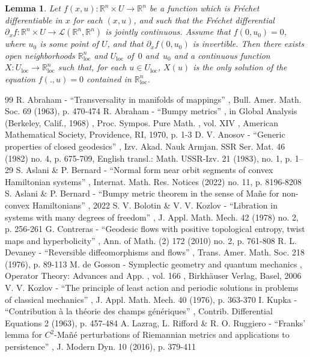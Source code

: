\documentclass[10pt]{amsart}
\newcommand{\loc}{\mathrm{loc}}
\newcommand{\Rm}{\mathbb{R}}
\newcommand{\mL}{\ensuremath{\mathcal{L}}}
\theoremstyle{plain}
\newtheorem{lem}{Lemma}
\theoremstyle{definition}
\begin{document}
\begin{lem}
Let $f(x,u):\Rm^n\times U\to \Rm^n$ be a function which is Fréchet differentiable in $x$ for each $(x,u)$, and such that
the Fréchet differential $\partial_xf:\Rm^n\times U\to \mL(\Rm^n,\Rm^n)$ is jointly continuous. Assume that $f(0,u_0)=0$, where $u_0$ is some point of $U$, and that $\partial_x f(0,u_0)$ is invertible. Then there exists open neighborhoods $\Rm^n_{\loc}$ and $U_{\loc}$ of~$0$ and~$u_0$ and a continuous function $X: U_{\loc}\to \Rm^n_{\loc}$ such that, for each $u\in U_{\loc}$,
$X(u)$ is the only solution of the equation $f(.,u)=0$ contained in $\Rm^n_{\loc}$.
\end{lem}


\begin{thebibliography}{99}
 R. Abraham - “Transversality in manifolds of mappings” , Bull. Amer. Math. Soc. 69 (1963), p. 470-474
 R. Abraham - “Bumpy metrics” , in Global Analysis (Berkeley, Calif., 1968) , Proc. Sympos. Pure Math. , vol. XIV , American Mathematical Society, Providence, RI, 1970, p. 1-3
 D. V. Anosov - “Generic properties of closed geodesics” , Izv. Akad. Nauk Armjan. SSR Ser. Mat. 46 (1982) no. 4, p. 675-709, English transl.: Math. USSR-Izv. 21 (1983), no. 1, p. 1–29
 S. Aslani \& P. Bernard - “Normal form near orbit segments of convex Hamiltonian systems” , Internat. Math. Res. Notices (2022) no. 11, p. 8196-8208
 S. Aslani \& P. Bernard - “Bumpy metric theorem in the sense of Mañe for non-convex Hamiltonians” , 2022
 S. V. Bolotin \& V. V. Kozlov - “Libration in systems with many degrees of freedom” , J. Appl. Math. Mech. 42 (1978) no. 2, p. 256-261
 G. Contreras - “Geodesic flows with positive topological entropy, twist maps and hyperbolicity” , Ann. of Math. (2) 172 (2010) no. 2, p. 761-808
 R. L. Devaney - “Reversible diffeomorphisms and flows” , Trans. Amer. Math. Soc. 218 (1976), p. 89-113
 M. de Gosson - Symplectic geometry and quantum mechanics , Operator Theory: Advances and App. , vol. 166 , Birkhäuser Verlag, Basel, 2006
 V. V. Kozlov - “The principle of least action and periodic solutions in problems of classical mechanics” , J. Appl. Math. Mech. 40 (1976), p. 363-370
 I. Kupka - “Contribution à la théorie des champs génériques” , Contrib. Differential Equations 2 (1963), p. 457-484
 A. Lazrag, L. Rifford \& R. O. Ruggiero - “Franks’ lemma for $C^2$-Mañé perturbations of Riemannian metrics and applications to persistence” , J. Modern Dyn. 10 (2016), p. 379-411

\end{thebibliography}
\end{document}

